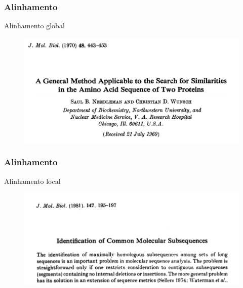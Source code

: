 \documentclass{beamer}
\begin{document}
	\begin{frame}\frametitle{Alinhamento}
	\begin{block}{Alinhamento global}\end{block}
	\begin{figure}[hbtp]
		\centering
		\includegraphics[scale=0.3]{img/needleman.png}
	\end{figure}
	\end{frame}

	\begin{frame}\frametitle{Alinhamento}
	\begin{block}{Alinhamento local}
		\begin{figure}[hbtp]
			\centering
			\includegraphics[scale=0.35]{img/smith_waterman.png}
		\end{figure}
	\end{block}
	\end{frame}
\end{document}
